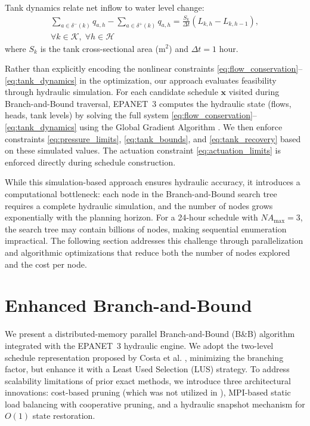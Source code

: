 \documentclass[final,3p,twocolumn]{elsarticle}
\begin{document}
Tank dynamics relate net inflow to water level change:
\begin{multline}
	\sum_{a \in \delta^-(k)} q_{a,h} - \sum_{a \in \delta^+(k)} q_{a,h} = \frac{S_k}{\Delta t} (L_{k,h} - L_{k,h-1}), \\
	\forall k \in \mathcal{K}, \; \forall h \in \mathcal{H}
	\label{eq:tank_dynamics}
\end{multline}
where $S_k$ is the tank cross-sectional area (m$^2$) and $\Delta t = 1$ hour.

Rather than explicitly encoding the nonlinear constraints \eqref{eq:flow_conservation}--\eqref{eq:tank_dynamics} in the optimization, our approach evaluates feasibility through hydraulic simulation. For each candidate schedule $\mathbf{x}$ visited during Branch-and-Bound traversal, EPANET~3 computes the hydraulic state (flows, heads, tank levels) by solving the full system \eqref{eq:flow_conservation}--\eqref{eq:tank_dynamics} using the Global Gradient Algorithm \cite{Todini1988}. We then enforce constraints \eqref{eq:pressure_limits}, \eqref{eq:tank_bounds}, and \eqref{eq:tank_recovery} based on these simulated values. The actuation constraint \eqref{eq:actuation_limits} is enforced directly during schedule construction.

While this simulation-based approach ensures hydraulic accuracy, it introduces a computational bottleneck: each node in the Branch-and-Bound search tree requires a complete hydraulic simulation, and the number of nodes grows exponentially with the planning horizon. For a 24-hour schedule with $NA_{\max}=3$, the search tree may contain billions of nodes, making sequential enumeration impractical. The following section addresses this challenge through parallelization and algorithmic optimizations that reduce both the number of nodes explored and the cost per node.

\section{Enhanced Branch-and-Bound}

We present a distributed-memory parallel Branch-and-Bound (B\&B) algorithm integrated with the EPANET~3 hydraulic engine. We adopt the two-level schedule representation proposed by Costa et al. \cite{Costa2016}, minimizing the branching factor, but enhance it with a Least Used Selection (LUS) strategy. To address scalability limitations of prior exact methods, we introduce three architectural innovations: cost-based pruning (which was not utilized in \cite{Costa2016}), MPI-based static load balancing with cooperative pruning, and a hydraulic snapshot mechanism for $O(1)$ state restoration.
\end{document}
